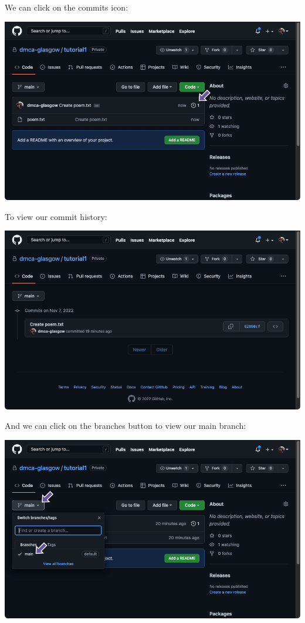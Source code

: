 \documentclass[
  letterpaper,
  DIV=11,
  numbers=noendperiod]{scrartcl}
\begin{document}
We can click on the commits icon:

\includegraphics{images/image17.png}

To view our commit history:

\includegraphics{images/image18.png}

And we can click on the branches button to view our main branch:

\includegraphics{images/image19.png}
\end{document}
